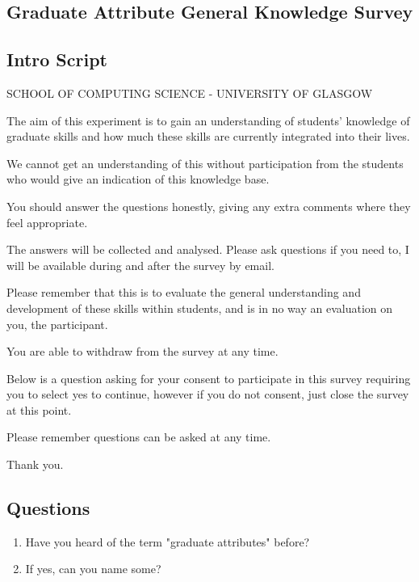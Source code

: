 \documentclass{l4proj}
\begin{document}
\begin{appendices}
\section{Graduate Attribute General Knowledge Survey} \label{Appendix-gradAttributeSurvey}

\subsection{Intro Script}

SCHOOL OF COMPUTING SCIENCE - UNIVERSITY OF GLASGOW

The aim of this experiment is to gain an understanding of students' knowledge of graduate skills and how much these skills are currently integrated into their lives. 

We cannot get an understanding of this without participation from the students who would give an indication of this knowledge base. 

You should answer the questions honestly, giving any extra comments where they feel appropriate.

The answers will be collected and analysed. Please ask questions if you need to, I will be available during and after the survey by email.

Please remember that this is to evaluate the general understanding and development of these skills within students, and is in no way an evaluation on you, the participant.

You are able to withdraw from the survey at any time.

Below is a question asking for your consent to participate in this survey requiring you to select yes to continue, however if you do not consent, just close the survey at this point.

Please remember questions can be asked at any time.

Thank you.

\subsection{Questions}

\begin{enumerate}
    \item Have you heard of the term "graduate attributes" before?
    \item If yes, can you name some?


\end{enumerate}
\end{appendices}
\end{document}
